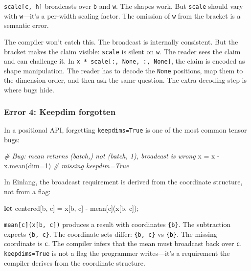 \documentclass[11pt,titlepage]{article}
\newenvironment{Shaded}{}{}
\newcommand{\CommentTok}[1]{\textcolor[rgb]{0.38,0.63,0.69}{\textit{#1}}}
\newcommand{\DecValTok}[1]{\textcolor[rgb]{0.25,0.63,0.44}{#1}}
\newcommand{\KeywordTok}[1]{\textcolor[rgb]{0.00,0.44,0.13}{\textbf{#1}}}
\newcommand{\NormalTok}[1]{#1}
\newcommand{\OperatorTok}[1]{\textcolor[rgb]{0.40,0.40,0.40}{#1}}
\begin{document}
\texttt{scale{[}c,\ h{]}} broadcasts over \texttt{b} and \texttt{w}. The
shapes work. But \texttt{scale} should vary with \texttt{w}---it's a
per-width scaling factor. The omission of \texttt{w} from the bracket is
a semantic error.

The compiler won't catch this. The broadcast is internally consistent.
But the bracket makes the claim visible: \texttt{scale} is silent on
\texttt{w}. The reader sees the claim and can challenge it. In
\texttt{x\ *\ scale{[}:,\ None,\ :,\ None{]}}, the claim is encoded as
shape manipulation. The reader has to decode the \texttt{None}
positions, map them to the dimension order, and then ask the same
question. The extra decoding step is where bugs hide.

\hypertarget{error-4-keepdim-forgotten}{%
\subsubsection{Error 4: Keepdim
forgotten}\label{error-4-keepdim-forgotten}}

In a positional API, forgetting \texttt{keepdims=True} is one of the
most common tensor bugs:

\begin{Shaded}
\begin{Highlighting}[]
\CommentTok{# Bug: mean returns (batch,) not (batch, 1), broadcast is wrong}
\NormalTok{x }\OperatorTok{=}\NormalTok{ x }\OperatorTok{-}\NormalTok{ x.mean(dim}\OperatorTok{=}\DecValTok{1}\NormalTok{)  }\CommentTok{# missing keepdim=True}
\end{Highlighting}
\end{Shaded}

In Einlang, the broadcast requirement is derived from the coordinate
structure, not from a flag:

\begin{Shaded}
\begin{Highlighting}[]
\KeywordTok{let}\NormalTok{ centered}\OperatorTok{[}\NormalTok{b, c}\OperatorTok{]}\NormalTok{ = x}\OperatorTok{[}\NormalTok{b, c}\OperatorTok{]}\NormalTok{ - mean}\OperatorTok{[}\NormalTok{c}\OperatorTok{]}\NormalTok{(x}\OperatorTok{[}\NormalTok{b, c}\OperatorTok{]}\NormalTok{);}
\end{Highlighting}
\end{Shaded}

\texttt{mean{[}c{]}(x{[}b,\ c{]})} produces a result with coordinates
\texttt{\{b\}}. The subtraction expects \texttt{\{b,\ c\}}. The
coordinate sets differ: \texttt{\{b,\ c\}} vs \texttt{\{b\}}. The
missing coordinate is \texttt{c}. The compiler infers that the mean must
broadcast back over \texttt{c}. \texttt{keepdims=True} is not a flag the
programmer writes---it's a requirement the compiler derives from the
coordinate structure.
\end{document}
